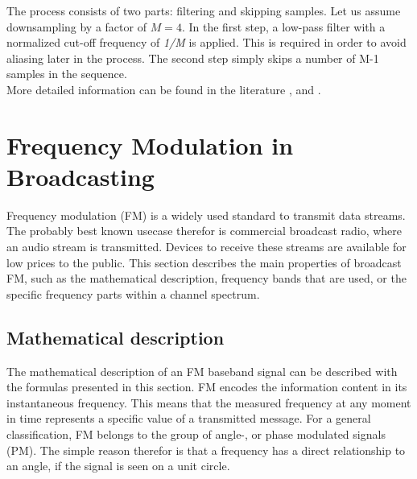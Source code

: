 The process consists of two parts: filtering and skipping samples.
Let us assume downsampling by a factor of $M=4$.
In the first step, a low-pass filter with a normalized cut-off frequency of \textit{1/M} is applied.
This is required in order to avoid aliasing later in the process.
The second step simply skips a number of M-1 samples in the sequence.\\

More detailed information can be found in the literature \cite[Ch.~6.9]{AlessioSilviaMaria2016DSPa}, \cite[Ch.~4.1]{GopiE.S2018MDSP} and \cite[Ch.~10.2.2]{ThyagarajanK.S2019ItDS}.

\section{Frequency Modulation in Broadcasting}

Frequency modulation (FM) is a widely used standard to transmit data streams.
The probably best known usecase therefor is commercial broadcast radio, where an audio stream is transmitted.
Devices to receive these streams are available for low prices to the public.
This section describes the main properties of broadcast FM, such as the mathematical description, frequency bands that are used, or the specific frequency parts within a channel spectrum.

\subsection{Mathematical description}

The mathematical description of an FM baseband signal can be described with the formulas presented in this section.
FM encodes the information content in its instantaneous frequency.
This means that the measured frequency at any moment in time represents a specific value of a transmitted message.
For a general classification, FM belongs to the group of angle-, or phase modulated signals (PM).
The simple reason therefor is that a frequency has a direct relationship to an angle, if the signal is seen on a unit circle.\\

